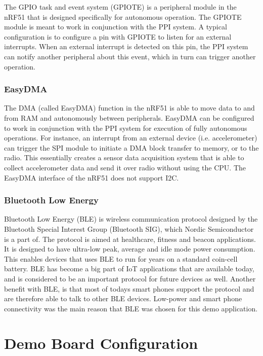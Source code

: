 The GPIO task and event system (GPIOTE) is a peripheral module in the nRF51 that is designed specifically for autonomous operation. The GPIOTE module is meant to work in conjunction with the PPI system. A typical configuration is to configure a pin with GPIOTE to listen for an external interrupts. When an external interrupt is detected on this pin, the PPI system can notify another peripheral about this event, which in turn can trigger another operation.

\subsubsection{EasyDMA}

The DMA (called EasyDMA) function in the nRF51 is able to move data to and from RAM and autonomously between peripherals. EasyDMA can be configured to work in conjunction with the PPI system for execution of fully autonomous operations. For instance, an interrupt from an external device (i.e. accelerometer) can trigger the SPI module to initiate a DMA block transfer to memory, or to the radio. This essentially creates a sensor data acquisition system that is able to collect accelerometer data and send it over radio without using the CPU. The EasyDMA interface of the nRF51 does not support I2C.

\subsubsection{Bluetooth Low Energy}

Bluetooth Low Energy (BLE) is wireless communication protocol designed by the Bluetooth Special Interest Group (Bluetooth SIG), which Nordic Semiconductor is a part of. The protocol is aimed at healthcare, fitness and beacon applications. It is designed to have ultra-low peak, average and idle mode power consumption. This enables devices that uses BLE to run for years on a standard coin-cell battery. BLE has become a big part of IoT applications that are available today, and is considered to be an important protocol for future devices as well. Another benefit with BLE, is that most of todays smart phones support the protocol and are therefore able to talk to other BLE devices. Low-power and smart phone connectivity was the main reason that BLE was chosen for this demo application. 

\section{Demo Board Configuration}


